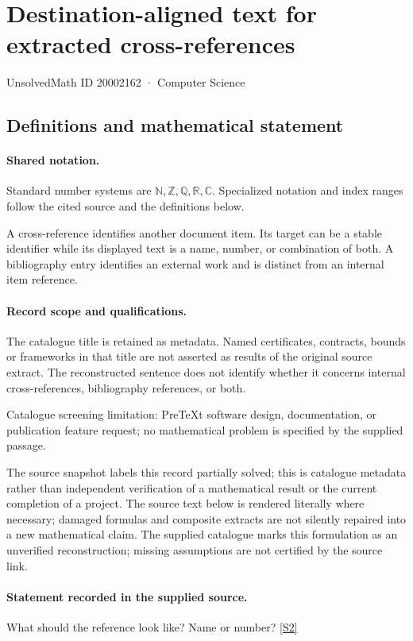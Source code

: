 \documentclass[11pt]{article}
\newcommand{\sref}[2]{\hyperlink{source:#1:#2}{[S#2]}}
\begin{document}
\setcounter{section}{20002161}
\section{Destination-aligned text for extracted cross-references}\label{20002162}
{\small\sffamily UnsolvedMath ID 20002162 · Computer Science}
\subsection{Definitions and mathematical statement}

\paragraph{Shared notation.}Standard number systems are $\mathbb N,\mathbb Z,\mathbb Q,\mathbb R,\mathbb C$. Specialized notation and index ranges follow the cited source and the definitions below.


A cross-reference identifies another document item. Its target can be a stable identifier while its displayed text is a name, number, or combination of both. A bibliography entry identifies an external work and is distinct from an internal item reference.
\paragraph{Record scope and qualifications.}
The catalogue title is retained as metadata. Named certificates, contracts, bounds or frameworks in that title are not asserted as results of the original source extract.
The reconstructed sentence does not identify whether it concerns internal cross-references, bibliography references, or both.

Catalogue screening limitation: PreTeXt software design, documentation, or publication feature request; no mathematical problem is specified by the supplied passage.

The source snapshot labels this record partially solved; this is catalogue metadata rather than independent verification of a mathematical result or the current completion of a project.
The source text below is rendered literally where necessary; damaged formulas and composite extracts are not silently repaired into a new mathematical claim.
The supplied catalogue marks this formulation as an unverified reconstruction; missing assumptions are not certified by the source link.
\paragraph{Statement recorded in the supplied source.}
What should the reference look like? Name or number? \sref{20002162}{2}
\end{document}
